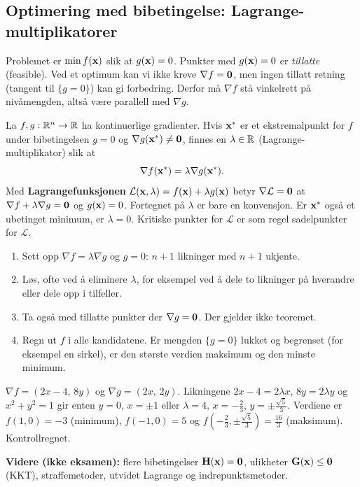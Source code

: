 


\subsection{Optimering med bibetingelse: Lagrange-multiplikatorer}
\begin{defn}
Problemet er $\min f(\mathbf{x})$ slik at $g(\mathbf{x})=0$. Punkter med $g(\mathbf{x})=0$ er \emph{tillatte} (feasible). Ved et optimum kan vi ikke kreve $\nabla f=\mathbf{0}$, men ingen tillatt retning (tangent til $\{g=0\}$) kan gi forbedring. Derfor må $\nabla f$ stå vinkelrett på nivåmengden, altså være parallell med $\nabla g$.
\end{defn}
\begin{teorem}[Lagrange]
La $f,g:\mathbb{R}^n\to\mathbb{R}$ ha kontinuerlige gradienter. Hvis $\mathbf{x}^*$ er et ekstremalpunkt for $f$ under bibetingelsen $g=0$ og $\nabla g(\mathbf{x}^*)\neq\mathbf{0}$, finnes en $\lambda\in\mathbb{R}$ (Lagrange-multiplikator) slik at
\[
\nabla f(\mathbf{x}^*)=\lambda\nabla g(\mathbf{x}^*).
\]
Med \textbf{Lagrangefunksjonen} $\mathcal L(\mathbf{x},\lambda)=f(\mathbf{x})+\lambda g(\mathbf{x})$ betyr $\nabla\mathcal L=\mathbf{0}$ at $\nabla f+\lambda\nabla g=\mathbf{0}$ og $g(\mathbf{x})=0$. Fortegnet på $\lambda$ er bare en konvensjon. Er $\mathbf{x}^*$ også et ubetinget minimum, er $\lambda=0$. Kritiske punkter for $\mathcal L$ er som regel sadelpunkter for $\mathcal L$.
\end{teorem}
\begin{oppskrift}
\begin{enumerate}
  \item Sett opp $\nabla f=\lambda\nabla g$ og $g=0$: $n+1$ likninger med $n+1$ ukjente.
  \item Løs, ofte ved å eliminere $\lambda$, for eksempel ved å dele to likninger på hverandre eller dele opp i tilfeller.
  \item Ta også med tillatte punkter der $\nabla g=\mathbf{0}$. Der gjelder ikke teoremet.
  \item Regn ut $f$ i alle kandidatene. Er mengden $\{g=0\}$ lukket og begrenset (for eksempel en sirkel), er den største verdien maksimum og den minste minimum.
\end{enumerate}
\end{oppskrift}
\begin{eksempel}[øving 5, oppg.~3: $f=x^2+4y^2-4x$ på $x^2+y^2=1$]
$\nabla f=(2x-4,\,8y)$ og $\nabla g=(2x,\,2y)$. Likningene $2x-4=2\lambda x$, $8y=2\lambda y$ og $x^2+y^2=1$ gir enten $y=0$, $x=\pm1$ eller $\lambda=4$, $x=-\tfrac23$, $y=\pm\tfrac{\sqrt5}3$. Verdiene er $f(1,0)=-3$ (minimum), $f(-1,0)=5$ og $f(-\tfrac23,\pm\tfrac{\sqrt5}{3})=\tfrac{16}3$ (maksimum). Kontrollregnet.
\end{eksempel}
\textbf{Videre (ikke eksamen):} flere bibetingelser $\mathbf{H}(\mathbf{x})=\mathbf{0}$, ulikheter $\mathbf{G}(\mathbf{x})\le\mathbf{0}$ (KKT), straffemetoder, utvidet Lagrange og indrepunktsmetoder.


